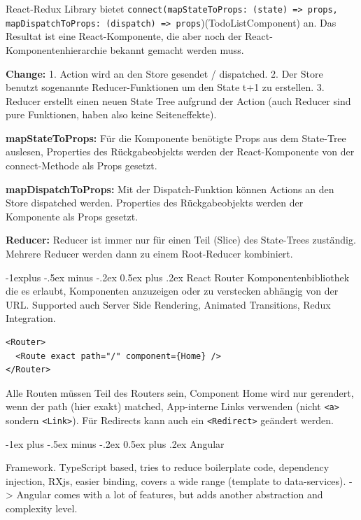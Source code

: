 \documentclass[a4paper, fontsize=6pt]{scrartcl}
\makeatletter
\renewcommand{\section}{\@startsection{section}{1}{0mm}%
    {-1ex plus -.5ex minus -.2ex}%
    {0.5ex plus .2ex}%
    {\normalfont\large\bfseries}}
\renewcommand{\subsection}{\@startsection{subsection}{2}{0mm}%
    {-1explus -.5ex minus -.2ex}%
    {0.5ex plus .2ex}%
    {\normalfont\normalsize\bfseries}}
\newcommand{\html}[1]{\texttt{#1}}
\newcommand{\js}[1]{\texttt{#1}}
\makeatother
\begin{document}
\begin{multicols*}{5}
React-Redux Library bietet \js{connect(mapStateToProps: (state) => props, mapDispatchToProps: (dispatch) => props})(TodoListComponent) an. Das Resultat ist eine React-Komponente, die aber noch der React-Komponentenhierarchie bekannt gemacht werden muss.

\textbf{Change:} 1. Action wird an den Store gesendet / dispatched. 2. Der Store benutzt sogenannte Reducer-Funktionen um den State t+1 zu erstellen. 3. Reducer erstellt einen neuen State Tree aufgrund der Action (auch Reducer sind pure Funktionen, haben also keine Seiteneffekte).

\textbf{mapStateToProps:} Für die Komponente benötigte Props aus dem State-Tree auslesen, Properties des Rückgabeobjekts werden der React-Komponente von der connect-Methode als Props gesetzt.

\textbf{mapDispatchToProps:} Mit der Dispatch-Funktion können Actions an den Store dispatched werden. Properties des Rückgabeobjekts werden der Komponente als Props gesetzt.

\textbf{Reducer:} Reducer ist immer nur für einen Teil (Slice) des State-Trees zuständig. Mehrere Reducer werden dann zu einem Root-Reducer kombiniert.

\subsection{React Router}
Komponentenbibliothek die es erlaubt, Komponenten anzuzeigen oder zu verstecken abhängig von der URL. Supported auch Server Side Rendering, Animated Transitions, Redux Integration.

\begin{verbatim}
<Router>
  <Route exact path="/" component={Home} />
</Router>
\end{verbatim}

Alle Routen müssen Teil des Routers sein, Component Home wird nur gerendert, wenn der path (hier exakt) matched, App-interne Links verwenden (nicht \html{<a>} sondern \html{<Link>}). Für Redirects kann auch ein \html{<Redirect>} geändert werden.

\section{Angular}

Framework. TypeScript based, tries to reduce boilerplate code, dependency injection, RXjs, easier binding, covers a wide range (template to data-services). -> Angular comes with a lot of features, but adds another abstraction and complexity level.


\end{multicols*}
\end{document}
